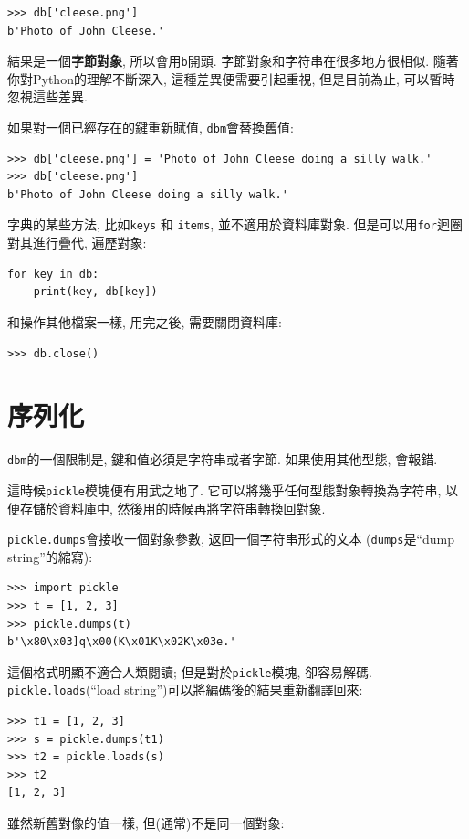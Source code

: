 \documentclass[10pt]{book}
\begin{document}
\begin{verbatim}
>>> db['cleese.png']
b'Photo of John Cleese.'
\end{verbatim}
%
結果是一個{\bf 字節對象}, 所以會用{\tt b}開頭. 
字節對象和字符串在很多地方很相似. 
隨著你對Python的理解不斷深入, 這種差異便需要引起重視, 但是目前為止, 
可以暫時忽視這些差異. 

如果對一個已經存在的鍵重新賦值, {\tt dbm}會替換舊值:

\begin{verbatim}
>>> db['cleese.png'] = 'Photo of John Cleese doing a silly walk.'
>>> db['cleese.png']
b'Photo of John Cleese doing a silly walk.'
\end{verbatim}
%

字典的某些方法, 比如{\tt keys} 和 {\tt items}, 
並不適用於資料庫對象. 但是可以用{\tt for}迴圈對其進行疊代, 遍歷對象:

\begin{verbatim}
for key in db:
    print(key, db[key])
\end{verbatim}
%
和操作其他檔案一樣, 用完之後, 需要關閉資料庫:

\begin{verbatim}
>>> db.close()
\end{verbatim}
%


\section{序列化}

{\tt dbm}的一個限制是, 鍵和值必須是字符串或者字節. 
如果使用其他型態, 會報錯. 
 

這時候{\tt pickle}模塊便有用武之地了. 
它可以將幾乎任何型態對象轉換為字符串, 以便存儲於資料庫中, 
然後用的時候再將字符串轉換回對象. 

{\tt pickle.dumps}會接收一個對象參數, 返回一個字符串形式的文本
({\tt dumps}是``dump string''的縮寫):

\begin{verbatim}
>>> import pickle
>>> t = [1, 2, 3]
>>> pickle.dumps(t)
b'\x80\x03]q\x00(K\x01K\x02K\x03e.'
\end{verbatim}
%

這個格式明顯不適合人類閱讀; 但是對於{\tt pickle}模塊, 卻容易解碼. 
{\tt pickle.loads}(``load string'')可以將編碼後的結果重新翻譯回來:

\begin{verbatim}
>>> t1 = [1, 2, 3]
>>> s = pickle.dumps(t1)
>>> t2 = pickle.loads(s)
>>> t2
[1, 2, 3]
\end{verbatim}
%
雖然新舊對像的值一樣, 但(通常)不是同一個對象:
\end{document}
